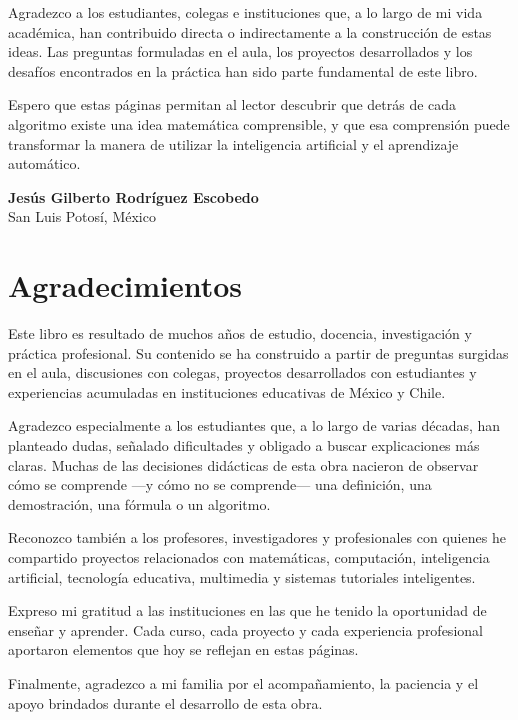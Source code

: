 \documentclass[
  spanish,
  10.5pt,
  letterpaper,
  DIV=11,
  numbers=noendperiod,
  oneside,
  open=any]{scrreprt}
\theoremstyle{definition}
\theoremstyle{definition}
\theoremstyle{plain}
\theoremstyle{remark}
\begin{document}
Agradezco a los estudiantes, colegas e instituciones que, a lo largo de
mi vida académica, han contribuido directa o indirectamente a la
construcción de estas ideas. Las preguntas formuladas en el aula, los
proyectos desarrollados y los desafíos encontrados en la práctica han
sido parte fundamental de este libro.

Espero que estas páginas permitan al lector descubrir que detrás de cada
algoritmo existe una idea matemática comprensible, y que esa comprensión
puede transformar la manera de utilizar la inteligencia artificial y el
aprendizaje automático.

\textbf{Jesús Gilberto Rodríguez Escobedo}\\
San Luis Potosí, México


\chapter*{Agradecimientos}\label{agradecimientos}


Este libro es resultado de muchos años de estudio, docencia,
investigación y práctica profesional. Su contenido se ha construido a
partir de preguntas surgidas en el aula, discusiones con colegas,
proyectos desarrollados con estudiantes y experiencias acumuladas en
instituciones educativas de México y Chile.

Agradezco especialmente a los estudiantes que, a lo largo de varias
décadas, han planteado dudas, señalado dificultades y obligado a buscar
explicaciones más claras. Muchas de las decisiones didácticas de esta
obra nacieron de observar cómo se comprende ---y cómo no se comprende---
una definición, una demostración, una fórmula o un algoritmo.

Reconozco también a los profesores, investigadores y profesionales con
quienes he compartido proyectos relacionados con matemáticas,
computación, inteligencia artificial, tecnología educativa, multimedia y
sistemas tutoriales inteligentes.

Expreso mi gratitud a las instituciones en las que he tenido la
oportunidad de enseñar y aprender. Cada curso, cada proyecto y cada
experiencia profesional aportaron elementos que hoy se reflejan en estas
páginas.

Finalmente, agradezco a mi familia por el acompañamiento, la paciencia y
el apoyo brindados durante el desarrollo de esta obra.
\end{document}
